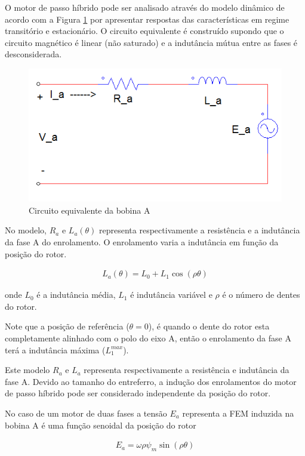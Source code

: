
O motor de passo híbrido pode ser analisado através do modelo dinâmico de acordo com a Figura \ref{fig:fig1} por apresentar respostas das características em regime transitório e estacionário. O circuito equivalente é construído supondo que o circuito magnético é linear (não saturado) e a indutância mútua entre as fases é desconsiderada.

\begin{figure}[H]
	\centering
	\includegraphics[scale=.42]{Images/graficofasea.PNG}
	\caption{ Circuito equivalente da bobina A}
	\label{fig:fig1}
\end{figure}

No modelo, $R_a$ e $L_a(\theta)$ representa respectivamente a resistência e a indutância da fase A do enrolamento. O enrolamento varia a indutância em função da posição do rotor.

\begin{eqnarray}
	\label{eq:eq1a}
	L_a(\theta) = L_0 + L_1\cos(\rho \theta)
\end{eqnarray}

onde $L_0$ é a indutância média, $L_1$ é indutância variável  e $\rho$ é o número de dentes do rotor.

Note que a posição de referência ($\theta = 0$), é quando o dente do rotor esta completamente alinhado com o polo do eixo A, então o enrolamento da fase A terá a indutância máxima ($L_1^{max}$).

Este modelo $R_a$ e $L_a$ representa respectivamente a resistência e indutância da fase A. Devido ao tamanho do entreferro, a indução dos enrolamentos do motor de passo híbrido pode ser considerado independente da posição do rotor. 

No caso de um motor de duas fases a tensão $E_a$ representa a FEM induzida na bobina A é uma função senoidal da posição do rotor

\begin{eqnarray}
	\label{eq:eq2a}
	E_a = \omega \rho \psi_m \sin(\rho \theta)
\end{eqnarray}


